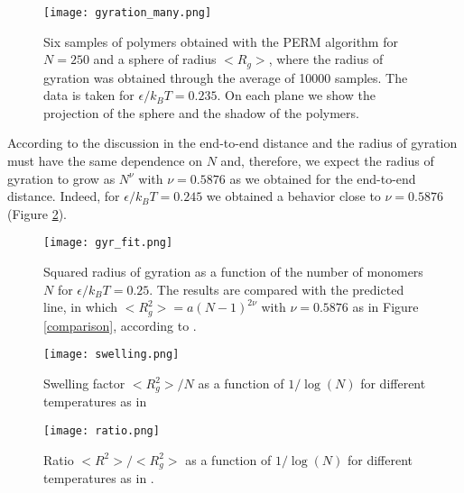 \documentclass[aps,prl,reprint,groupedaddress]{revtex4-1}
\begin{document}
\begin{figure}[tb]
	\texttt{[image: gyration\_many.png]}
	\caption{Six samples of polymers obtained with the PERM algorithm for $N=250$ and a sphere of radius $<R_g>$, where the radius of gyration was obtained through the average of 10000 samples. The data is taken for $\epsilon/k_B T = 0.235$. On each plane we show the projection of the sphere and the shadow of the polymers. \label{gyration_idea}}
\end{figure}

According to the discussion in \cite{Smith1975} the end-to-end distance and the radius of gyration must have the same dependence on $N$ and, therefore, we expect the radius of gyration to grow as $N^{\nu}$ with $\nu = 0.5876$ as we obtained for the end-to-end distance. Indeed, for $\epsilon/k_B T = 0.245$ we obtained a behavior close to $\nu = 0.5876$ (Figure \ref{gyr_fit}).

\begin{figure}[tb]
	\texttt{[image: gyr\_fit.png]}
	\caption{Squared radius of gyration as a function of the number of monomers $N$ for $\epsilon/k_B T = 0.25$. The results are compared with the predicted line, in which $<R_g^2> = a(N-1)^{2 \nu}$ with $\nu = 0.5876$ as in Figure \ref{comparison}, according to \cite{Smith1975}. \label{gyr_fit}}
\end{figure}

\begin{figure}[tb]
	\texttt{[image: swelling.png]}
	\caption{Swelling factor $<R_g^2>/N$ as a function of $1/\log(N)$ for different temperatures as in \cite{Grassberger1997} \label{swell}}
\end{figure}

\begin{figure}[tb]
	\texttt{[image: ratio.png]}
	\caption{Ratio $<R^2>/<R_g^2>$ as a function of $1/\log(N)$ for different temperatures as in \cite{Grassberger1997}. \label{ratio}}
\end{figure}
\end{document}
